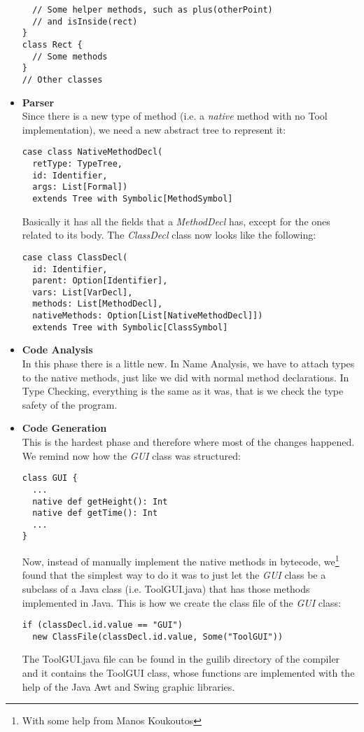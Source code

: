 \begin{itemize}
\begin{lstlisting}
  // Some helper methods, such as plus(otherPoint)
  // and isInside(rect)
}
class Rect {
  // Some methods
}
// Other classes
\end{lstlisting}
\item{\textbf{Parser}} \hfill \\
Since there is a new type of method (i.e. a \textit{native} method with no Tool implementation), we need a new abstract tree to represent it:
\begin{lstlisting}
case class NativeMethodDecl(
  retType: TypeTree,
  id: Identifier,
  args: List[Formal])
  extends Tree with Symbolic[MethodSymbol]
\end{lstlisting}
Basically it has all the fields that a \textit{MethodDecl} has, except for the ones related to its body.
The \textit{ClassDecl} class now looks like the following:
\begin{lstlisting}
case class ClassDecl(
  id: Identifier,
  parent: Option[Identifier],
  vars: List[VarDecl],
  methods: List[MethodDecl],
  nativeMethods: Option[List[NativeMethodDecl]])
  extends Tree with Symbolic[ClassSymbol]
\end{lstlisting}
\item{\textbf{Code Analysis}} \hfill \\
In this phase there is a little new.
In Name Analysis, we have to attach types to the native methods, just like we did with normal method declarations.
In Type Checking, everything is the same as it was, that is we check the type safety of the program.
\item{\textbf{Code Generation}} \hfill \\
This is the hardest phase and therefore where most of the changes happened.
We remind now how the \textit{GUI} class was structured:
\begin{lstlisting}
class GUI {
  ...
  native def getHeight(): Int
  native def getTime(): Int
  ...
}
\end{lstlisting}
Now, instead of manually implement the native methods in bytecode, we\footnote{With some help from Manos Koukoutos} found that the simplest way to do it was to just let the \textit{GUI} class be a subclass of a Java class (i.e. ToolGUI.java) that has those methods implemented in Java.
This is how we create the class file of the \textit{GUI} class:
\begin{lstlisting}
if (classDecl.id.value == "GUI")
  new ClassFile(classDecl.id.value, Some("ToolGUI"))
\end{lstlisting}
The ToolGUI.java file can be found in the gui\textunderscore lib directory of the compiler and it contains the ToolGUI class, whose functions are implemented with the help of the Java Awt and Swing graphic libraries.

\end{itemize}
